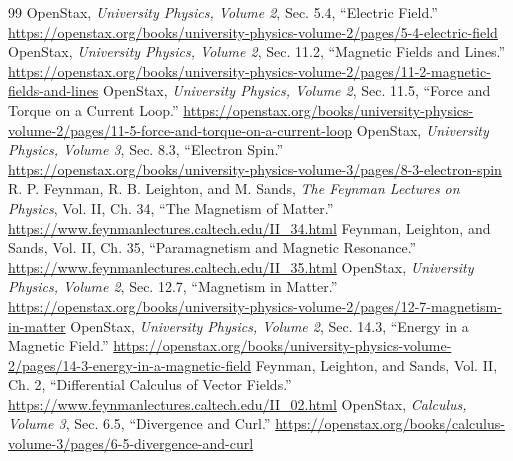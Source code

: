 \documentclass[11pt,letterpaper]{article}
\begin{document}
\begingroup\small
\raggedright
\begin{thebibliography}{99}
 OpenStax, \emph{University Physics, Volume 2}, Sec. 5.4, ``Electric Field.''
\url{https://openstax.org/books/university-physics-volume-2/pages/5-4-electric-field}
 OpenStax, \emph{University Physics, Volume 2}, Sec. 11.2, ``Magnetic Fields and Lines.''
\url{https://openstax.org/books/university-physics-volume-2/pages/11-2-magnetic-fields-and-lines}
 OpenStax, \emph{University Physics, Volume 2}, Sec. 11.5, ``Force and Torque on a Current Loop.''
\url{https://openstax.org/books/university-physics-volume-2/pages/11-5-force-and-torque-on-a-current-loop}
 OpenStax, \emph{University Physics, Volume 3}, Sec. 8.3, ``Electron Spin.''
\url{https://openstax.org/books/university-physics-volume-3/pages/8-3-electron-spin}
 R. P. Feynman, R. B. Leighton, and M. Sands, \emph{The Feynman Lectures on Physics}, Vol. II, Ch. 34, ``The Magnetism of Matter.''
\url{https://www.feynmanlectures.caltech.edu/II_34.html}
 Feynman, Leighton, and Sands, Vol. II, Ch. 35, ``Paramagnetism and Magnetic Resonance.''
\url{https://www.feynmanlectures.caltech.edu/II_35.html}
 OpenStax, \emph{University Physics, Volume 2}, Sec. 12.7, ``Magnetism in Matter.''
\url{https://openstax.org/books/university-physics-volume-2/pages/12-7-magnetism-in-matter}
 OpenStax, \emph{University Physics, Volume 2}, Sec. 14.3, ``Energy in a Magnetic Field.''
\url{https://openstax.org/books/university-physics-volume-2/pages/14-3-energy-in-a-magnetic-field}
 Feynman, Leighton, and Sands, Vol. II, Ch. 2, ``Differential Calculus of Vector Fields.''
\url{https://www.feynmanlectures.caltech.edu/II_02.html}
 OpenStax, \emph{Calculus, Volume 3}, Sec. 6.5, ``Divergence and Curl.''
\url{https://openstax.org/books/calculus-volume-3/pages/6-5-divergence-and-curl}
\end{thebibliography}
\endgroup

\newpage
\end{document}
